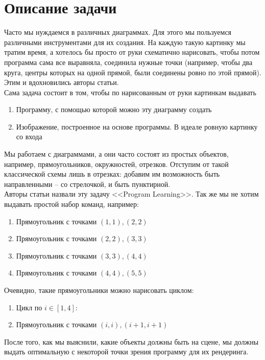 \documentclass{article}
\begin{document}
\section{Описание задачи}
Часто мы нуждаемся в различных диаграммах. Для этого мы пользуемся различными инструментами для их создания. На каждую такую картинку мы тратим время, а хотелось бы просто от руки схематично нарисовать, чтобы потом программа сама все выравняла, соединила нужные точки (например, чтобы два круга, центры которых на одной прямой, были соединены ровно по этой прямой). Этим и вдохновились авторы статьи.\\
Сама задача состоит в том, чтобы по нарисованным от руки картинкам выдавать
\begin{enumerate}
    \item Программу, с помощью которой можно эту диаграмму создать
    \item Изображение, построенное на основе программы. В идеале ровную картинку со входа
\end{enumerate}
Мы работаем с диаграммами, а они часто состоят из простых объектов, например, прямоугольников, окружностей, отрезков. Отступим от такой классической схемы лишь в отрезках: добавим им возможность быть направленными -- со стрелочкой, и быть пунктирной. \\
Авторы статьи назвали эту задачу <<Program Learning>>. Так же мы не хотим выдавать простой набор команд, например:
\begin{enumerate}
    \item Прямоугольник с точками $(1, 1), (2, 2)$
    \item Прямоугольник с точками $(2, 2), (3, 3)$
    \item Прямоугольник с точками $(3, 3), (4, 4)$
    \item Прямоугольник с точками $(4, 4), (5, 5)$
\end{enumerate}
Очевидно, такие прямоугольники можно нарисовать циклом:
\begin{enumerate}
    \item[] Цикл по $i \in [1, 4]$:
    \item[] \qquad Прямоугольник с точками $(i, i), (i + 1, i + 1)$
\end{enumerate}
После того, как мы выяснили, какие объекты должны быть на сцене, мы должны выдать оптимальную с некоторой точки зрения программу для их рендеринга.
\end{document}
